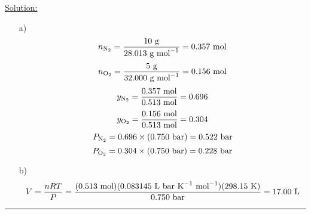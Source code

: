 \noindent
\underline{Solution:}\\

\begin{itemize}

\item[a)] $$n_{\textnormal{N}_2} = \frac{10\textnormal{ g}}{28.013\textnormal{ g mol}^{-1}} = 0.357\textnormal{ mol}$$
$$n_{\textnormal{O}_2} = \frac{5\textnormal{ g}}{32.000\textnormal{ g mol}^{-1}} = 0.156\textnormal{ mol}$$
$$y_{\textnormal{N}_2} = \frac{0.357\textnormal{ mol}}{0.513\textnormal{ mol}} = 0.696$$
$$y_{\textnormal{O}_2} = \frac{0.156\textnormal{ mol}}{0.513\textnormal{ mol}} = 0.304$$
$$P_{\textnormal{N}_2} = 0.696\times(0.750\textnormal{ bar}) = 0.522\textnormal{ bar}$$
$$P_{\textnormal{O}_2} = 0.304\times(0.750\textnormal{ bar}) = 0.228\textnormal{ bar}$$

\item[b)] $$V = \frac{nRT}{P} = \frac{(0.513\textnormal{ mol})(0.083145\textnormal{ L bar K}^{-1}\textnormal{ mol}^{-1})(298.15\textnormal{ K})}{0.750\textnormal{ bar}} = 17.00\textnormal{ L}$$

\end{itemize}

\hrule\vspace{0.5cm}

